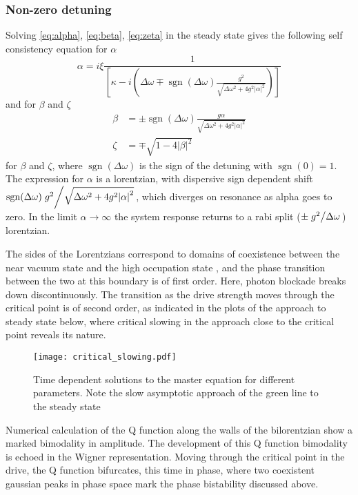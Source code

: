 \subsubsection{Non-zero detuning}
Solving \cref{eq:alpha}, \cref{eq:beta}, \cref{eq:zeta} in the steady state gives the following self consistency equation for $\alpha$
\begin{equation}
  \alpha = i \xi\frac{1}{\left[\kappa-i\left(\Delta \omega \mp \operatorname{sgn}(\Delta \omega) \frac{g^2}{\sqrt{\Delta \omega^2 +4g^2 |\alpha|^2}}\right)\right]}
\end{equation}
and for $\beta$ and $\zeta$
\begin{align}
  \beta& = \pm \operatorname{sgn}(\Delta \omega) \frac{g \alpha}{\sqrt{\Delta \omega^2 + 4 g^2 |\alpha|^2}}\\
  \zeta& = \mp \sqrt{1-4|\beta|^2}
\end{align}
for $\beta$ and $\zeta$, where $\operatorname{sgn}(\Delta \omega)$ is the sign of the detuning with $\operatorname{sgn}(0) = 1$.
The expression for $\alpha$ is a lorentzian, with dispersive sign dependent shift $ \operatorname{sgn}(\Delta\omega)\flatfrac{g^2}{\sqrt{\Delta\omega^2+4g^2\abs{\alpha}^2}}$, which diverges on resonance as alpha goes to zero. 
In the limit $\alpha \rightarrow \infty$ the system response returns to a rabi split ($\pm\flatfrac{g^2}{\Delta\omega}$) lorentzian.

The sides of the Lorentzians correspond to domains of coexistence between the near vacuum state and the high occupation state \cite{Carmichael2015}, and the phase transition between the two at this boundary is of first order. 
Here, photon blockade breaks down discontinuously.
The transition as the drive strength moves through the critical point is of second order, as indicated in the plots of the approach to steady state below, where critical slowing in the approach close to the critical point reveals its nature.

\begin{figure*}[ht]
  \texttt{[image: critical\_slowing.pdf]}
  \caption{Time dependent solutions to the master equation for different parameters. Note the slow asymptotic approach of the green line to the steady state}
  \label{critical_slowing}
\end{figure*}
Numerical calculation of the Q function along the walls of the bilorentzian show a marked bimodality in amplitude. The development of this Q function bimodality is echoed in the Wigner representation. Moving through the critical point in the drive, the Q function bifurcates, this time in phase, where two coexistent gaussian peaks in phase space mark the phase bistability discussed above.
